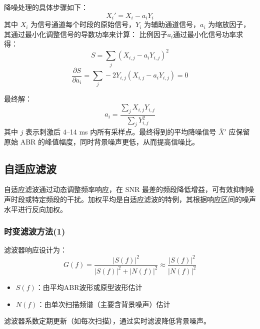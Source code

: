 降噪处理的具体步骤如下：
\begin{equation}
    X_i' = X_i - a_i Y_i
\end{equation}
其中 $X_i$ 为信号通道每个时段的原始信号，$Y_i$ 为辅助通道信号，$a_i$ 为缩放因子，其通过最小化调整信号的导数功率来计算：
比例因子$a_i$通过最小化信号功率求得：
\[ S = \sum_j (X_{i,j} - a_i Y_{i,j})^2 \]
\[ \frac{\partial S}{\partial a_i} =  \sum_j -2Y_{i,j}(X_{i,j} - a_i Y_{i,j}) = 0 \]

最终解：
\[ a_i = \frac{\sum_j X_{i,j} Y_{i,j}}{\sum_j Y_{i,j}^2} \]
其中 $j$ 表示刺激后 4–14 ms 内所有采样点。最终得到的平均降噪信号 $\bar{X}'$ 应保留原始 ABR 的峰值幅度，同时背景噪声更低，从而提高信噪比。

\subsection*{自适应滤波}
自适应滤波通过动态调整频率响应，在 SNR 最差的频段降低增益，可有效抑制噪声时段或特定频段的干扰。加权平均是自适应滤波的特例，其根据响应区间的噪声水平进行反向加权。

\subsubsection{时变滤波方法(1)}
滤波器响应设计为：
\[
G(f) = \frac{|S(f)|^2}{|S(f)|^2 + |N(f)|^2} \approx \frac{|S(f)|^2}{|N(f)|^2}
\]
\begin{itemize}
\item $S(f)$：由平均ABR波形或原型波形估计
\item $N(f)$：由单次扫描频谱（主要含背景噪声）估计
\end{itemize}
滤波器系数定期更新（如每次扫描），通过实时滤波降低背景噪声。

